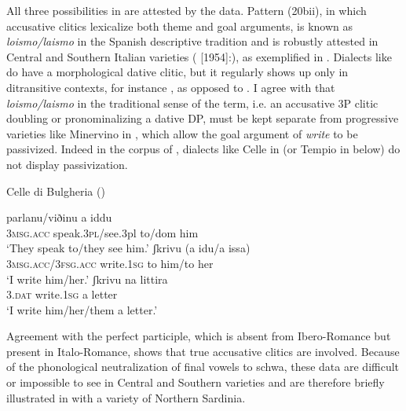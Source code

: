\documentclass[output=paper]{langscibook}
\begin{document}
All three possibilities in  are attested by the data. Pattern (20bii), in which accusative clitics lexicalize both theme and goal arguments, is known as \textit{loismo/laismo} in the Spanish descriptive tradition and is robustly attested in Central and Southern Italian varieties (\citealt{Rohlfs1969} [1954]:), as exemplified in . Dialects like  do have a morphological dative clitic, but it regularly shows up only in ditransitive contexts, for instance , as opposed to . I agree with \citet{Pineda2016} that \textit{loismo/laismo} in the traditional sense of the term, i.e. an accusative 3P clitic doubling or pronominalizing a dative DP, must be kept separate from progressive varieties like Minervino in , which allow the goal argument of \textit{write} to be passivized. Indeed in the corpus of \citet{ManziniSavoia2005}, dialects like Celle in  (or Tempio in  below) do not display passivization. 

\ea\label{ex:manzini:}
Celle di Bulgheria (\citealt{ManziniSavoia2005})\\
\begin{xlist}
\ex {}    {parlanu/viðinu}   {a}   {iddu}\\
\textsc{3msg.acc}  speak.\textsc{3pl}/see.3pl   to/dom him\\
\glt ‘They speak to/they see him.’
\ex {}       {ʃkrivu}     (a {idu/a} issa)\\
\textsc{3msg.acc/3fsg.acc} write.\textsc{1sg}   to him/to her\\
\glt ‘I write him/her.’  
\ex {}   {ʃkrivu}     {na} {littira}\\
\textsc{3.dat}   write.\textsc{1sg}   a letter\\
\glt ‘I write him/her/them a letter.’
\end{xlist}
\z


Agreement with the perfect participle, which is absent from Ibero-Romance but present in Italo-Romance, shows that true accusative clitics are involved. Because of the phonological neutralization of final vowels to schwa, these data are difficult or impossible to see in Central and Southern varieties and are therefore briefly illustrated in  with a variety of Northern Sardinia.
\end{document}
